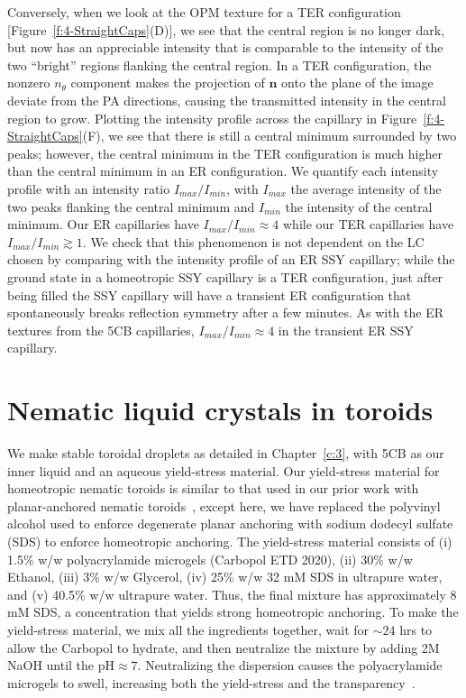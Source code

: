 Conversely, when we look at the OPM texture for a TER configuration [Figure~\ref{f:4-StraightCaps}(D)], we see that the central region is no longer dark, but now has an appreciable intensity that is comparable to the intensity of the two ``bright'' regions flanking the central region.
In a TER configuration, the nonzero $n_{\theta}$ component makes the projection of $\mathbf{n}$ onto the plane of the image deviate from the PA directions, causing the transmitted intensity in the central region to grow.
Plotting the intensity profile across the capillary in Figure~\ref{f:4-StraightCaps}(F), we see that there is still a central minimum surrounded by two peaks; however, the central minimum in the TER configuration is much higher than the central minimum in an ER configuration.
We quantify each intensity profile with an intensity ratio $I_{max}/I_{min}$, with $I_{max}$ the average intensity of the two peaks flanking the central minimum and $I_{min}$ the intensity of the central minimum.
Our ER capillaries have $I_{max}/I_{min} \approx 4$ while our TER capillaries have $I_{max}/I_{min} \gtrsim 1$.
We check that this phenomenon is not dependent on the LC chosen by comparing with the intensity profile of an ER SSY capillary; while the ground state in a homeotropic SSY capillary is a TER configuration, just after being filled the SSY capillary will have a transient ER configuration that spontaneously breaks reflection symmetry after a few minutes.
As with the ER textures from the 5CB capillaries, $I_{max}/I_{min} \approx 4$ in the transient ER SSY capillary.




\section{Nematic liquid crystals in toroids}
We make stable toroidal droplets as detailed in Chapter~\ref{c:3}, with 5CB as our inner liquid and an aqueous yield-stress material.
Our yield-stress material for homeotropic nematic toroids is similar to that used in our prior work with planar-anchored nematic toroids~\cite{RN46}, except here, we have replaced the polyvinyl alcohol used to enforce degenerate planar anchoring with sodium dodecyl sulfate (SDS) to enforce homeotropic anchoring.
The yield-stress material consists of (i) 1.5\% w/w polyacrylamide microgels (Carbopol ETD 2020), (ii) 30\% w/w Ethanol, (iii) 3\% w/w Glycerol, (iv) 25\% w/w 32 mM SDS in ultrapure water, and (v) 40.5\% w/w ultrapure water.
Thus, the final mixture has approximately 8 mM SDS, a concentration that yields strong homeotropic anchoring.
To make the yield-stress material, we mix all the ingredients together, wait for $\sim 24$ hrs to allow the Carbopol to hydrate, and then neutralize the mixture by adding 2M NaOH until the pH$\approx 7$.
Neutralizing the dispersion causes the polyacrylamide microgels to swell, increasing both the yield-stress and the transparency~\cite{RN46,RN47}.

